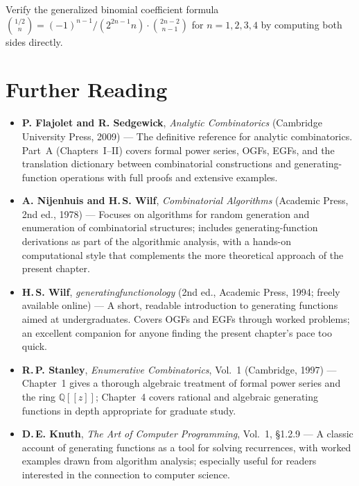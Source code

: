 \begin{exercise}
Verify the generalized binomial coefficient formula $\binom{1/2}{n} = (-1)^{n-1}/(2^{2n-1} n) \cdot \binom{2n-2}{n-1}$ for $n = 1, 2, 3, 4$ by computing both sides directly.
\end{exercise}

\section*{Further Reading}

\begin{itemize}
  \item \textbf{P. Flajolet and R. Sedgewick}, \emph{Analytic Combinatorics} (Cambridge University Press, 2009) \cite{FlajoletSedgewick2009} --- The definitive reference for analytic combinatorics. Part~A (Chapters~I--II) covers formal power series, OGFs, EGFs, and the translation dictionary between combinatorial constructions and generating-function operations with full proofs and extensive examples.

  \item \textbf{A. Nijenhuis and H.\,S. Wilf}, \emph{Combinatorial Algorithms} (Academic Press, 2nd ed., 1978) \cite{NijenhuisWilf1978} --- Focuses on algorithms for random generation and enumeration of combinatorial structures; includes generating-function derivations as part of the algorithmic analysis, with a hands-on computational style that complements the more theoretical approach of the present chapter.

  \item \textbf{H.\,S. Wilf}, \emph{generatingfunctionology} (2nd ed., Academic Press, 1994; freely available online) --- A short, readable introduction to generating functions aimed at undergraduates. Covers OGFs and EGFs through worked problems; an excellent companion for anyone finding the present chapter's pace too quick.

  \item \textbf{R.\,P. Stanley}, \emph{Enumerative Combinatorics}, Vol.~1 (Cambridge, 1997) --- Chapter~1 gives a thorough algebraic treatment of formal power series and the ring $\mathbb{Q}[[z]]$; Chapter~4 covers rational and algebraic generating functions in depth appropriate for graduate study.

  \item \textbf{D.\,E. Knuth}, \emph{The Art of Computer Programming}, Vol.~1, \S1.2.9 --- A classic account of generating functions as a tool for solving recurrences, with worked examples drawn from algorithm analysis; especially useful for readers interested in the connection to computer science.
\end{itemize}
